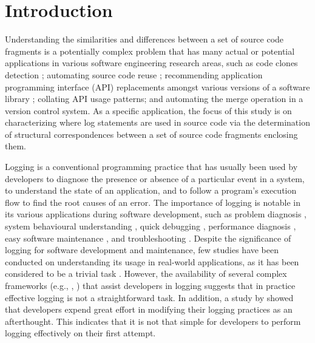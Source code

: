 \chapter{Introduction}  \label{Introduction}
 
Understanding the similarities and differences between a set of source code fragments is a potentially complex problem that has many actual or potential applications in various software engineering research areas, such as code clones detection \cite{bulychev2009evaluation}; automating source code reuse \cite{2008:fse:cottrell}; recommending application programming interface (API) replacements amongst various versions of a software library \cite{2014:uofc:cossette}; collating API usage patterns; and automating the merge operation in a version control system. As a specific application, the focus of this study is on characterizing where log statements are used in source code via the determination of structural correspondences between a set of source code fragments enclosing them.

Logging is a conventional programming practice that has usually been used by developers to diagnose the presence or absence of a particular event in a system, to understand the state of an application, and to follow a program's execution flow to find the root causes of an error. The importance of logging is notable in its various applications during software development, such as problem diagnosis \cite{lou2010mining}, system behavioural understanding \cite{fu2013contextual}, quick debugging \cite{gupta2005pro}, performance diagnosis \cite{nagaraj2012structured}, easy software maintenance \cite{gupta2005pro}, and troubleshooting \cite{fu2009execution}. Despite the significance of logging for software development and maintenance, few studies have been conducted on understanding its usage in real-world applications, as it has been considered to be a trivial task \cite{clarke1999dimension,clarke1999subject}. However, the availability of several complex frameworks (e.g., , ) that assist developers in logging suggests that in practice effective logging is not a straightforward task. In addition, a study by \citet{yuan2012characterizing} showed that developers expend great effort in modifying their logging practices as an afterthought. This indicates that it is not that simple for developers to perform logging effectively on their first attempt. 

